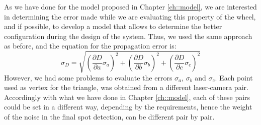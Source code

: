 As we have done for the model proposed in Chapter \ref{ch::model}, we are interested in determining the error made while we are evaluating this property of the wheel, and if possible, to develop a model that allows to determine the better configuration during the design of the system. Thus, we used the same approach as before, and the equation for the propagation error is:
  \begin{equation}
    \sigma_D = \sqrt{
      \left( \frac{\partial D}{\partial a} \sigma_a \right)^2 + 
      \left( \frac{\partial D}{\partial b} \sigma_b \right)^2 + 
      \left( \frac{\partial D}{\partial c} \sigma_c \right)^2
    }
    \label{eq:diam-prop-1}
  \end{equation}
However, we had some problems to evaluate the errors $\sigma_a$, $\sigma_b$ and $\sigma_c$. Each point used as vertex for the triangle, was obtained from a different laser-camera pair. Accordingly with what we have done in Chapter \ref{ch::model}, each of these pairs could be set in a different way, depending by the requirements, hence the weight of the noise in the final spot detection, can be different pair by pair.

